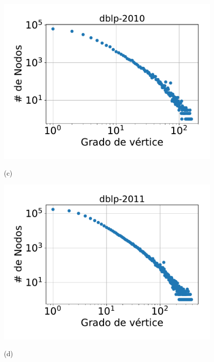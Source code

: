 \begin{figure}
    	\begin{minipage}{1\textwidth}
    		\centering
    		\begin{minipage}{0.45\textwidth}
    			\centering
    			\includegraphics[width=1\linewidth]{img/grades/dblp-2010.pdf}
    			
    			(c)
    		\end{minipage}
    		\begin{minipage}{0.45\textwidth}
    			\centering
    			\includegraphics[width=1\linewidth]{img/grades/dblp-2011.pdf}
    			
    			(d)
    		\end{minipage}  
    	\end{minipage}


\end{figure}
